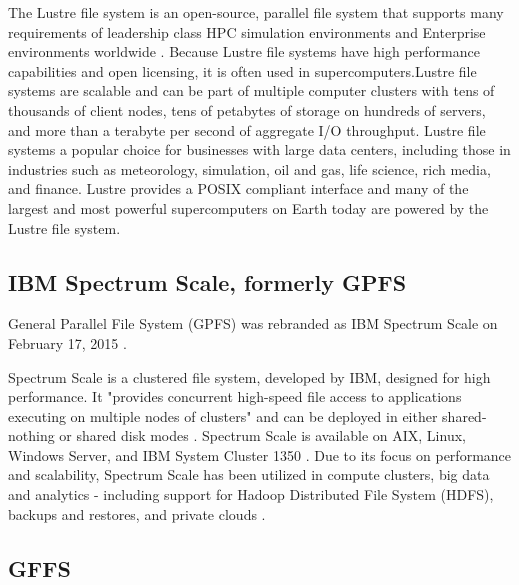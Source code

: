 {     The Lustre file system is an open-source,
     parallel file system that supports many requirements of
     leadership class HPC simulation environments and Enterprise
     environments worldwide \cite{www-lustre}. Because Lustre file systems have high
     performance capabilities and open licensing, it is often used in
     supercomputers.Lustre file systems are scalable and can be part
     of multiple computer clusters with tens of thousands of client
     nodes, tens of petabytes of storage on hundreds of servers, and
     more than a terabyte per second of aggregate I/O
     throughput. Lustre file systems a popular choice for businesses
     with large data centers, including those in industries such as
     meteorology, simulation, oil and gas, life science, rich media,
     and finance. Lustre provides a POSIX compliant interface and many
     of the largest and most powerful supercomputers on Earth today
     are powered by the Lustre file system.

     \pv
     
\subsection{IBM Spectrum Scale, formerly GPFS}

     General Parallel File System (GPFS) was rebranded as IBM Spectrum 
     Scale on February 17, 2015 \cite{www-wikigpfs}.

     Spectrum Scale is a clustered file system, developed by IBM,
     designed for high performance. It "provides concurrent high-speed
     file access to applications executing on multiple nodes of
     clusters" and can be deployed in either
     shared-nothing or shared disk modes \cite{www-wikigpfs}.
     Spectrum Scale is available
     on AIX, Linux, Windows Server, and IBM System Cluster 1350
     \cite{www-wikigpfs}.  Due to its focus on performance and
     scalability, Spectrum Scale has been utilized in compute
     clusters, big data and analytics - including support for Hadoop
     Distributed File System (HDFS), backups and restores, and private
     clouds \cite{www-spectrumscale}.

     \pv

\subsection{GFFS}

}

